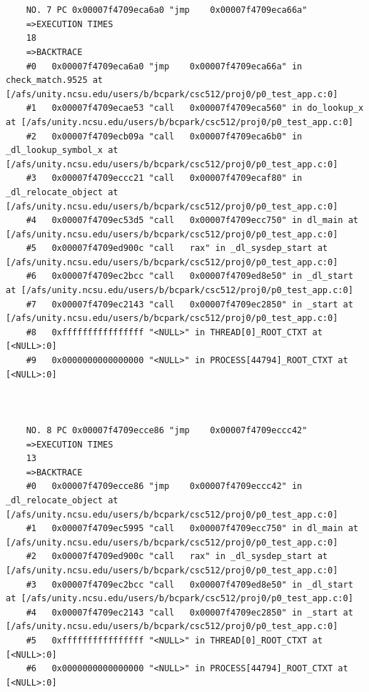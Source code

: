 \documentclass[11pt]{article}
\begin{document}
\begin{verbatim}
    
    
    NO. 7 PC 0x00007f4709eca6a0 "jmp    0x00007f4709eca66a"
    =>EXECUTION TIMES
    18
    =>BACKTRACE
    #0   0x00007f4709eca6a0 "jmp    0x00007f4709eca66a" in check_match.9525 at [/afs/unity.ncsu.edu/users/b/bcpark/csc512/proj0/p0_test_app.c:0]
    #1   0x00007f4709ecae53 "call   0x00007f4709eca560" in do_lookup_x at [/afs/unity.ncsu.edu/users/b/bcpark/csc512/proj0/p0_test_app.c:0]
    #2   0x00007f4709ecb09a "call   0x00007f4709eca6b0" in _dl_lookup_symbol_x at [/afs/unity.ncsu.edu/users/b/bcpark/csc512/proj0/p0_test_app.c:0]
    #3   0x00007f4709eccc21 "call   0x00007f4709ecaf80" in _dl_relocate_object at [/afs/unity.ncsu.edu/users/b/bcpark/csc512/proj0/p0_test_app.c:0]
    #4   0x00007f4709ec53d5 "call   0x00007f4709ecc750" in dl_main at [/afs/unity.ncsu.edu/users/b/bcpark/csc512/proj0/p0_test_app.c:0]
    #5   0x00007f4709ed900c "call   rax" in _dl_sysdep_start at [/afs/unity.ncsu.edu/users/b/bcpark/csc512/proj0/p0_test_app.c:0]
    #6   0x00007f4709ec2bcc "call   0x00007f4709ed8e50" in _dl_start at [/afs/unity.ncsu.edu/users/b/bcpark/csc512/proj0/p0_test_app.c:0]
    #7   0x00007f4709ec2143 "call   0x00007f4709ec2850" in _start at [/afs/unity.ncsu.edu/users/b/bcpark/csc512/proj0/p0_test_app.c:0]
    #8   0xffffffffffffffff "<NULL>" in THREAD[0]_ROOT_CTXT at [<NULL>:0]
    #9   0x0000000000000000 "<NULL>" in PROCESS[44794]_ROOT_CTXT at [<NULL>:0]
    
    
    
    NO. 8 PC 0x00007f4709ecce86 "jmp    0x00007f4709eccc42"
    =>EXECUTION TIMES
    13
    =>BACKTRACE
    #0   0x00007f4709ecce86 "jmp    0x00007f4709eccc42" in _dl_relocate_object at [/afs/unity.ncsu.edu/users/b/bcpark/csc512/proj0/p0_test_app.c:0]
    #1   0x00007f4709ec5995 "call   0x00007f4709ecc750" in dl_main at [/afs/unity.ncsu.edu/users/b/bcpark/csc512/proj0/p0_test_app.c:0]
    #2   0x00007f4709ed900c "call   rax" in _dl_sysdep_start at [/afs/unity.ncsu.edu/users/b/bcpark/csc512/proj0/p0_test_app.c:0]
    #3   0x00007f4709ec2bcc "call   0x00007f4709ed8e50" in _dl_start at [/afs/unity.ncsu.edu/users/b/bcpark/csc512/proj0/p0_test_app.c:0]
    #4   0x00007f4709ec2143 "call   0x00007f4709ec2850" in _start at [/afs/unity.ncsu.edu/users/b/bcpark/csc512/proj0/p0_test_app.c:0]
    #5   0xffffffffffffffff "<NULL>" in THREAD[0]_ROOT_CTXT at [<NULL>:0]
    #6   0x0000000000000000 "<NULL>" in PROCESS[44794]_ROOT_CTXT at [<NULL>:0]
    
    
    

\end{verbatim}
\end{document}

